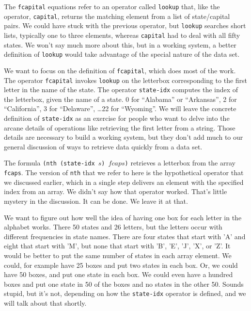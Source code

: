 The \texttt{fcapital} equations refer to an operator
called \texttt{lookup} that, like the operator, \texttt{capital},
returns the matching element from a list of state/capital pairs.
We could have stuck with the previous operator,
but \texttt{lookup} searches short lists,
typically one to three elements,
whereas \texttt{capital} had to deal with all fifty states.
We won't say much more about this, but in a working system,
a better definition of \texttt{lookup}
would take advantage of the special nature of the data set.

We want to focus on the definition of \texttt{fcapital},
which does most of the work.
The operator \texttt{fcapital} invokes \texttt{lookup}
on the letterbox corresponding to the first letter
in the name of the state.
The operator \texttt{state-idx} computes the index
of the letterbox, given the name of a state.
0 for ``Alabama'' or ``Arkansas'', 2 for ``California'',
3 for ``Delaware'', \dots 22 for  ``Wyoming''.
We will leave the concrete
definition of \texttt{state-idx} as an exercise for
people who want to delve into the arcane details of
operations like retrieving the first letter from a string.
Those details are necessary to build a working system,
but they don't add much to our general discussion of ways
to retrieve data quickly from a data set.

The formula
\texttt{(nth (state-idx $s$) $fcaps$)}
retrieves a letterbox from the array \texttt{fcaps}.
The version of \texttt{nth} that we refer to here
is the hypothetical operator that we discussed earlier,
which in a single step delivers an element
with the specified index from an array.
We didn't say how that operator worked.
That's little mystery in the discussion.
It can be done. We leave it at that.

We want to figure out
how well the idea of having one box for each letter
in the alphabet works.
There 50 states and 26 letters, but the letters occur
with different frequencies in state names.
There are four states that start with 'A' and
eight that start with 'M',
but none that start with 'B', 'E', 'J', 'X', or 'Z'.
It would be better to put the same number of states in each
array element. We could, for example have 25 boxes and put
two states in each box. Or, we could have 50 boxes, and put
one state in each box.
We could even have a hundred boxes and put one state in 50
of the boxes and no states in the other 50.
Sounds stupid, but it's not, depending on how
the \texttt{state-idx} operator is defined,
and we will talk about that shortly.

